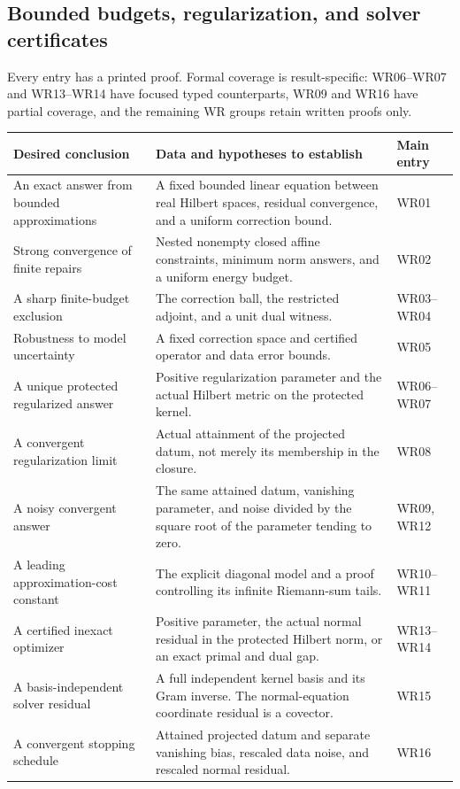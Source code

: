 \subsection{Bounded budgets, regularization, and solver certificates}
Every entry has a printed proof. Formal coverage is result-specific: WR06--WR07 and WR13--WR14 have focused typed counterparts, WR09 and WR16 have partial coverage, and the remaining WR groups retain written proofs only.
\begin{longtable}{@{}p{.24\linewidth}p{.48\linewidth}p{.21\linewidth}@{}}
\toprule Desired conclusion & Data and hypotheses to establish & Main entry\\\midrule\endhead
An exact answer from bounded approximations & A fixed bounded linear equation between real Hilbert spaces, residual convergence, and a uniform correction bound. & WR01\\[4pt]
Strong convergence of finite repairs & Nested nonempty closed affine constraints, minimum norm answers, and a uniform energy budget. & WR02\\[4pt]
A sharp finite-budget exclusion & The correction ball, the restricted adjoint, and a unit dual witness. & WR03--WR04\\[4pt]
Robustness to model uncertainty & A fixed correction space and certified operator and data error bounds. & WR05\\[4pt]
A unique protected regularized answer & Positive regularization parameter and the actual Hilbert metric on the protected kernel. & WR06--WR07\\[4pt]
A convergent regularization limit & Actual attainment of the projected datum, not merely its membership in the closure. & WR08\\[4pt]
A noisy convergent answer & The same attained datum, vanishing parameter, and noise divided by the square root of the parameter tending to zero. & WR09, WR12\\[4pt]
A leading approximation-cost constant & The explicit diagonal model and a proof controlling its infinite Riemann-sum tails. & WR10--WR11\\[4pt]
A certified inexact optimizer & Positive parameter, the actual normal residual in the protected Hilbert norm, or an exact primal and dual gap. & WR13--WR14\\[4pt]
A basis-independent solver residual & A full independent kernel basis and its Gram inverse. The normal-equation coordinate residual is a covector. & WR15\\[4pt]
A convergent stopping schedule & Attained projected datum and separate vanishing bias, rescaled data noise, and rescaled normal residual. & WR16\\\bottomrule
\end{longtable}

